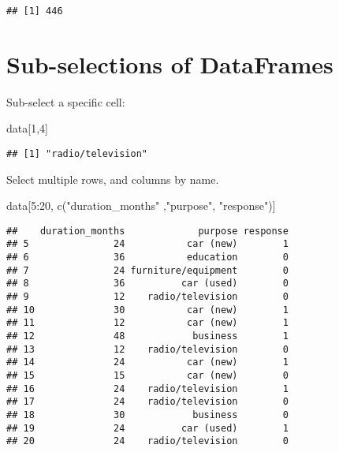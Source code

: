 \documentclass[
]{article}
\newenvironment{Shaded}{\begin{snugshade}}{\end{snugshade}}
\newcommand{\DecValTok}[1]{\textcolor[rgb]{0.00,0.00,0.81}{#1}}
\newcommand{\FunctionTok}[1]{\textcolor[rgb]{0.00,0.00,0.00}{#1}}
\newcommand{\NormalTok}[1]{#1}
\newcommand{\SpecialCharTok}[1]{\textcolor[rgb]{0.00,0.00,0.00}{#1}}
\newcommand{\StringTok}[1]{\textcolor[rgb]{0.31,0.60,0.02}{#1}}
\begin{document}
\begin{verbatim}
## [1] 446
\end{verbatim}

\hypertarget{sub-selections-of-dataframes}{%
\section{Sub-selections of
DataFrames}\label{sub-selections-of-dataframes}}

Sub-select a specific cell:

\begin{Shaded}
\begin{Highlighting}[]
\NormalTok{data[}\DecValTok{1}\NormalTok{,}\DecValTok{4}\NormalTok{]}
\end{Highlighting}
\end{Shaded}

\begin{verbatim}
## [1] "radio/television"
\end{verbatim}

Select multiple rows, and columns by name.

\begin{Shaded}
\begin{Highlighting}[]
\NormalTok{data[}\DecValTok{5}\SpecialCharTok{:}\DecValTok{20}\NormalTok{, }\FunctionTok{c}\NormalTok{(}\StringTok{"duration\_months"}\NormalTok{ ,}\StringTok{"purpose"}\NormalTok{, }\StringTok{"response"}\NormalTok{)]}
\end{Highlighting}
\end{Shaded}

\begin{verbatim}
##    duration_months             purpose response
## 5               24           car (new)        1
## 6               36           education        0
## 7               24 furniture/equipment        0
## 8               36          car (used)        0
## 9               12    radio/television        0
## 10              30           car (new)        1
## 11              12           car (new)        1
## 12              48            business        1
## 13              12    radio/television        0
## 14              24           car (new)        1
## 15              15           car (new)        0
## 16              24    radio/television        1
## 17              24    radio/television        0
## 18              30            business        0
## 19              24          car (used)        1
## 20              24    radio/television        0
\end{verbatim}
\end{document}
